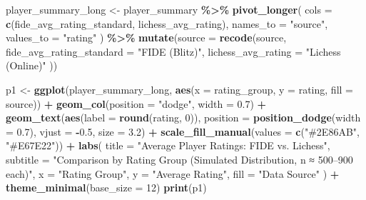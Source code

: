 \documentclass[
]{article}
\newenvironment{Shaded}{\begin{snugshade}}{\end{snugshade}}
\newcommand{\AttributeTok}[1]{\textcolor[rgb]{0.13,0.29,0.53}{#1}}
\newcommand{\DecValTok}[1]{\textcolor[rgb]{0.00,0.00,0.81}{#1}}
\newcommand{\FloatTok}[1]{\textcolor[rgb]{0.00,0.00,0.81}{#1}}
\newcommand{\FunctionTok}[1]{\textcolor[rgb]{0.13,0.29,0.53}{\textbf{#1}}}
\newcommand{\NormalTok}[1]{#1}
\newcommand{\OtherTok}[1]{\textcolor[rgb]{0.56,0.35,0.01}{#1}}
\newcommand{\SpecialCharTok}[1]{\textcolor[rgb]{0.81,0.36,0.00}{\textbf{#1}}}
\newcommand{\StringTok}[1]{\textcolor[rgb]{0.31,0.60,0.02}{#1}}
\begin{document}
\begin{Shaded}
\begin{Highlighting}[]
\NormalTok{player\_summary\_long }\OtherTok{\textless{}{-}}\NormalTok{ player\_summary }\SpecialCharTok{\%\textgreater{}\%}
  \FunctionTok{pivot\_longer}\NormalTok{(}
    \AttributeTok{cols =} \FunctionTok{c}\NormalTok{(fide\_avg\_rating\_standard, lichess\_avg\_rating),}
    \AttributeTok{names\_to =} \StringTok{"source"}\NormalTok{, }\AttributeTok{values\_to =} \StringTok{"rating"}
\NormalTok{  ) }\SpecialCharTok{\%\textgreater{}\%}
  \FunctionTok{mutate}\NormalTok{(}\AttributeTok{source =} \FunctionTok{recode}\NormalTok{(source,}
    \AttributeTok{fide\_avg\_rating\_standard =} \StringTok{"FIDE (Blitz)"}\NormalTok{,}
    \AttributeTok{lichess\_avg\_rating =} \StringTok{"Lichess (Online)"}
\NormalTok{  ))}

\NormalTok{p1 }\OtherTok{\textless{}{-}} \FunctionTok{ggplot}\NormalTok{(player\_summary\_long, }\FunctionTok{aes}\NormalTok{(}\AttributeTok{x =}\NormalTok{ rating\_group, }\AttributeTok{y =}\NormalTok{ rating, }\AttributeTok{fill =}\NormalTok{ source)) }\SpecialCharTok{+}
  \FunctionTok{geom\_col}\NormalTok{(}\AttributeTok{position =} \StringTok{"dodge"}\NormalTok{, }\AttributeTok{width =} \FloatTok{0.7}\NormalTok{) }\SpecialCharTok{+}
  \FunctionTok{geom\_text}\NormalTok{(}\FunctionTok{aes}\NormalTok{(}\AttributeTok{label =} \FunctionTok{round}\NormalTok{(rating, }\DecValTok{0}\NormalTok{)), }\AttributeTok{position =} \FunctionTok{position\_dodge}\NormalTok{(}\AttributeTok{width =} \FloatTok{0.7}\NormalTok{), }\AttributeTok{vjust =} \SpecialCharTok{{-}}\FloatTok{0.5}\NormalTok{, }\AttributeTok{size =} \FloatTok{3.2}\NormalTok{) }\SpecialCharTok{+}
  \FunctionTok{scale\_fill\_manual}\NormalTok{(}\AttributeTok{values =} \FunctionTok{c}\NormalTok{(}\StringTok{"\#2E86AB"}\NormalTok{, }\StringTok{"\#E67E22"}\NormalTok{)) }\SpecialCharTok{+}
  \FunctionTok{labs}\NormalTok{(}
    \AttributeTok{title =} \StringTok{"Average Player Ratings: FIDE vs. Lichess"}\NormalTok{,}
    \AttributeTok{subtitle =} \StringTok{"Comparison by Rating Group (Simulated Distribution, n ≈ 500–900 each)"}\NormalTok{,}
    \AttributeTok{x =} \StringTok{"Rating Group"}\NormalTok{,}
    \AttributeTok{y =} \StringTok{"Average Rating"}\NormalTok{,}
    \AttributeTok{fill =} \StringTok{"Data Source"}
\NormalTok{  ) }\SpecialCharTok{+}
  \FunctionTok{theme\_minimal}\NormalTok{(}\AttributeTok{base\_size =} \DecValTok{12}\NormalTok{)}
\FunctionTok{print}\NormalTok{(p1)}
\end{Highlighting}
\end{Shaded}
\end{document}
